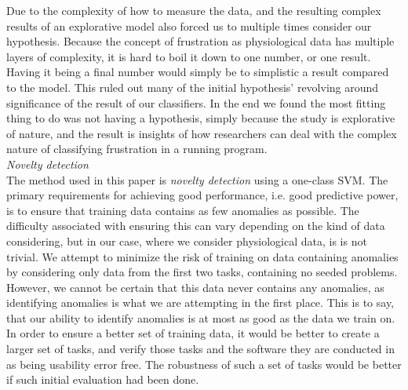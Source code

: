 Due to the complexity of how to measure the data, and the resulting complex results of an explorative model also forced us to multiple times consider our hypothesis. Because the concept of frustration as physiological data has multiple layers of complexity, it is hard to boil it down to one number, or one result. Having it being a final number would simply be to simplistic a result compared to the model. This ruled out many of the initial hypothesis' revolving around significance of the result of our classifiers. In the end we found the most fitting thing to do was not having a hypothesis, simply because the study is explorative of nature, and the result is insights of how researchers can deal with the complex nature of classifying frustration in a running program.\\

\textit{Novelty detection}\\
The method used in this paper is \textit{novelty detection} using a one-class SVM. The primary requirements for
achieving good performance, i.e. good predictive power, is to ensure that training data contains as few anomalies as
possible. The difficulty associated with ensuring this can vary depending on the kind of data considering, but in our
case, where we consider physiological data, is is not trivial. We attempt to minimize the risk of
training on data containing anomalies by considering only data from the first two tasks, containing no seeded
problems. However, we cannot be certain that this data never contains any anomalies, as identifying anomalies is what we
are attempting in the first place. This is to say, that our ability to identify anomalies is at most as good as the data
we train on. In order to ensure a better set of training data, it would be better to create a larger set of tasks, and verify those tasks and the software they are conducted in as being usability error free. 
The robustness of such a set of tasks would be better if such initial evaluation had been done.

